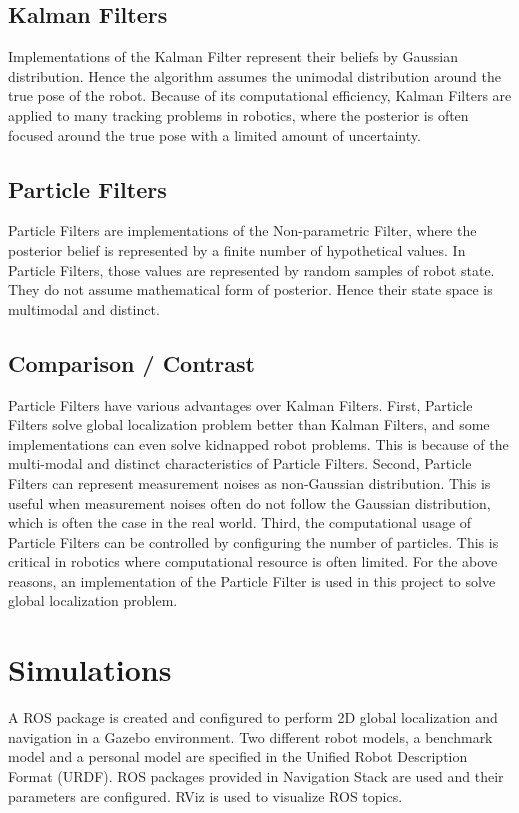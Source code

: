 \documentclass[10pt,journal,compsoc]{IEEEtran}
\begin{document}
\subsection{Kalman Filters}
Implementations of the Kalman Filter represent their beliefs by Gaussian distribution. Hence the algorithm assumes the unimodal distribution around the true pose of the robot. Because of its computational efficiency, Kalman Filters are applied to many tracking problems in robotics, where the posterior is often focused around the true pose with a limited amount of uncertainty.

\subsection{Particle Filters}
Particle Filters are implementations of the Non-parametric Filter, where the posterior belief is represented by a finite number of hypothetical values. In Particle Filters, those values are represented by random samples of robot state. They do not assume mathematical form of posterior. Hence their state space is multimodal and distinct.

\subsection{Comparison / Contrast}
Particle Filters have various advantages over Kalman Filters.
First, Particle Filters solve global localization problem better than Kalman Filters, and some implementations can even solve kidnapped robot problems. This is because of the multi-modal and distinct characteristics of Particle Filters. Second, Particle Filters can represent measurement noises as non-Gaussian distribution. This is useful when measurement noises often do not follow the Gaussian distribution, which is often the case in the real world. Third, the computational usage of Particle Filters can be controlled by configuring the number of particles. This is critical in robotics where computational resource is often limited. For the above reasons, an implementation of the Particle Filter is used in this project to solve global localization problem.

\section{Simulations}
A ROS package is created and configured to perform 2D global localization and navigation in a Gazebo environment. Two different robot models, a benchmark model and a personal model are specified in the Unified Robot Description Format (URDF). ROS packages provided in Navigation Stack \cite{ROS:navigation} are used and their parameters are configured. RViz is used to visualize ROS topics.
\end{document}
